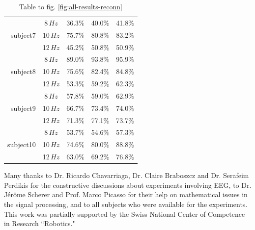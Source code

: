 \documentclass[smallextended]{svjour3}
\begin{document}
\begin{table}
\begin{center}
\begin{tabular}{ r | c | c | c | c }
        \hline

        \multirow{3}{*}{subject7} &  8\,$Hz$ & 36.3\% & 40.0\% & 41.8\% \\
                                  & 10\,$Hz$ & 75.7\% & 80.8\% & 83.2\% \\
                                  & 12\,$Hz$ & 45.2\% & 50.8\% & 50.9\% \\

        \hline

        \multirow{3}{*}{subject8} &  8\,$Hz$ & 89.0\% & 93.8\% & 95.9\% \\
                                  & 10\,$Hz$ & 75.6\% & 82.4\% & 84.8\% \\
                                  & 12\,$Hz$ & 53.3\% & 59.2\% & 62.3\% \\

        \hline

        \multirow{3}{*}{subject9} &  8\,$Hz$ & 57.8\% & 59.0\% & 62.9\% \\
                                  & 10\,$Hz$ & 66.7\% & 73.4\% & 74.0\% \\
                                  & 12\,$Hz$ & 71.3\% & 77.1\% & 73.7\% \\

        \hline

        \multirow{3}{*}{subject10} &  8\,$Hz$ & 53.7\% & 54.6\% & 57.3\% \\
                                  & 10\,$Hz$ & 74.6\% & 80.0\% & 88.8\% \\
                                  & 12\,$Hz$ & 63.0\% & 69.2\% & 76.8\% \\

    \end{tabular}
    \caption{Table to fig. \ref{fig:all-results-reconn}}
\end{center}\end{table}

\fi


\begin{acknowledgement}
Many thanks to Dr. Ricardo Chavarriaga, Dr. Claire Braboszcz and Dr. Serafeim Perdikis for the constructive discussions about experiments involving EEG, to Dr. J\'er\^ome Scherer and Prof. Marco Picasso for their help on mathematical issues in the signal processing, and to all subjects who were available for the experiments. This work was partially supported by the Swiss National Center of Competence in Research ``Robotics."
\end{acknowledgement}


\end{document}
